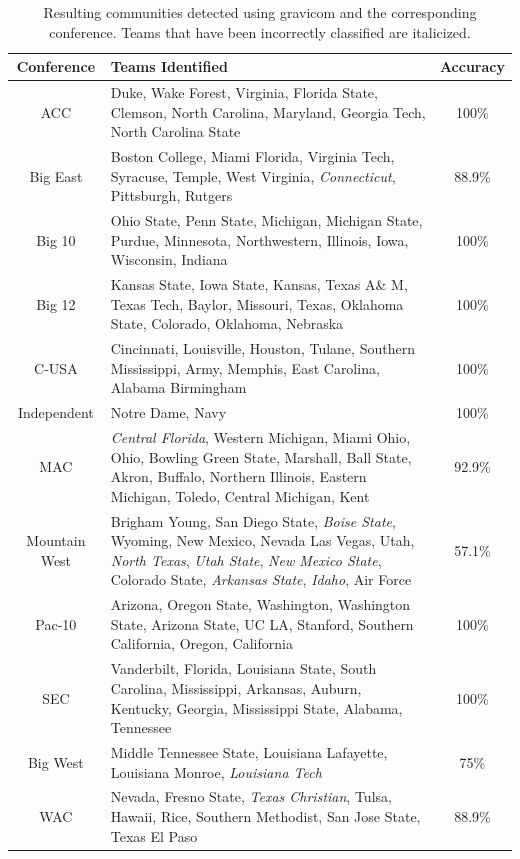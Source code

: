 \documentclass{article}\usepackage[]{graphicx}\usepackage[]{color}
\begin{document}
\begin{table}[H]
\centering
\begin{tabular}{cp{10cm}c}
  \hline
Conference & Teams Identified & Accuracy \\ 
  \hline
ACC & Duke,  Wake Forest,  Virginia,  Florida State,  Clemson,  North Carolina,  Maryland,  Georgia Tech,  North Carolina State & 100\% \\ 
  Big East & Boston College,  Miami Florida,  Virginia Tech,  Syracuse,  Temple,  West Virginia, {\it  Connecticut},  Pittsburgh,  Rutgers & 88.9\% \\ 
  Big 10 & Ohio State,  Penn State,  Michigan,  Michigan State,  Purdue,  Minnesota,  Northwestern,  Illinois,  Iowa,  Wisconsin,  Indiana & 100\% \\ 
  Big 12 & Kansas State,  Iowa State,  Kansas,  Texas A\& M,  Texas Tech,  Baylor,  Missouri,  Texas,  Oklahoma State,  Colorado,  Oklahoma,  Nebraska & 100\% \\ 
  C-USA & Cincinnati,  Louisville,  Houston,  Tulane,  Southern Mississippi,  Army,  Memphis,  East Carolina,  Alabama Birmingham & 100\% \\ 
  Independent & Notre Dame,  Navy & 100\% \\ 
  MAC & {\it  Central Florida},  Western Michigan,  Miami Ohio,  Ohio,  Bowling Green State,  Marshall,  Ball State,  Akron,  Buffalo,  Northern Illinois,  Eastern Michigan,  Toledo,  Central Michigan,  Kent & 92.9\% \\ 
  Mountain West & Brigham Young,  San Diego State, {\it  Boise State},  Wyoming,  New Mexico,  Nevada Las Vegas,  Utah, {\it  North Texas}, {\it  Utah State}, {\it  New Mexico State},  Colorado State, {\it  Arkansas State}, {\it  Idaho},  Air Force & 57.1\% \\ 
  Pac-10 & Arizona,  Oregon State,  Washington,  Washington State,  Arizona State,  UC LA,  Stanford,  Southern California,  Oregon,  California & 100\% \\ 
  SEC & Vanderbilt,  Florida,  Louisiana State,  South Carolina,  Mississippi,  Arkansas,  Auburn,  Kentucky,  Georgia,  Mississippi State,  Alabama,  Tennessee & 100\% \\ 
  Big West & Middle Tennessee State,  Louisiana Lafayette,  Louisiana Monroe, {\it  Louisiana Tech} & 75\% \\ 
  WAC & Nevada,  Fresno State, {\it  Texas Christian},  Tulsa,  Hawaii,  Rice,  Southern Methodist,  San Jose State,  Texas El Paso & 88.9\% \\ 
   \hline
\end{tabular}
\caption{Resulting communities detected using gravicom and the corresponding conference. Teams that have been incorrectly classified are italicized.} 
\label{tab:football_final}
\end{table}
\end{document}
